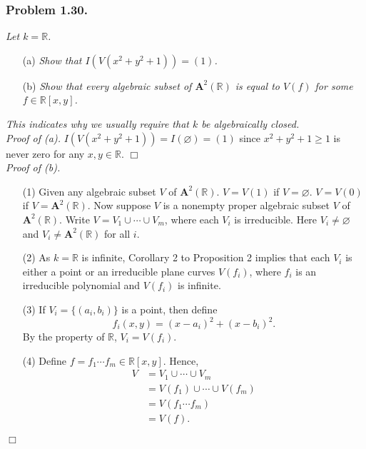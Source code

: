 \documentclass{article}
\begin{document}
\subsubsection*{Problem 1.30.}
\emph{Let $k = \mathbb{R}$.}
\begin{enumerate}
\item[(a)]
  \emph{Show that $I(V(x^2+y^2+1))=(1)$.}

\item[(b)]
  \emph{Show that every algebraic subset of $\mathbf{A}^2(\mathbb{R})$ is equal to $V(f)$
  for some $f \in \mathbb{R}[x,y]$.}
\end{enumerate}
\emph{This indicates why we usually require that $k$ be algebraically closed.} \\



\emph{Proof of (a).}
$I(V(x^2+y^2+1)) = I(\varnothing) = (1)$
since $x^2+y^2+1 \geq 1$ is never zero for any $x, y \in \mathbb{R}$.
$\Box$ \\



\emph{Proof of (b).}
\begin{enumerate}
\item[(1)]
  Given any algebraic subset $V$ of $\mathbf{A}^2(\mathbb{R})$.
  $V = V(1)$ if $V = \varnothing$.
  $V = V(0)$ if $V = \mathbf{A}^2(\mathbb{R})$.
  Now suppose $V$ is a nonempty proper algebraic subset $V$ of $\mathbf{A}^2(\mathbb{R})$.
  Write $V = V_1 \cup \cdots \cup V_m$,
  where each $V_i$ is irreducible.
  Here $V_i \neq \varnothing$ and $V_i \neq \mathbf{A}^2(\mathbb{R})$ for all $i$.

\item[(2)]
  As $k = \mathbb{R}$ is infinite,
  Corollary 2 to Proposition 2 implies that each $V_i$ is either a point
  or an irreducible plane curves $V(f_i)$,
  where $f_i$ is an irreducible polynomial and $V(f_i)$ is infinite.

\item[(3)]
  If $V_i = \{ (a_i,b_i) \}$ is a point, then define
  \[
    f_i(x,y) = (x-a_i)^2 + (x-b_i)^2.
  \]
  By the property of $\mathbb{R}$, $V_i = V(f_i)$.

\item[(4)]
  Define $f = f_1 \cdots f_m \in \mathbb{R}[x,y]$.
  Hence,
  \begin{align*}
    V
    &= V_1 \cup \cdots \cup V_m \\
    &= V(f_1) \cup \cdots \cup V(f_m) \\
    &= V(f_1 \cdots f_m) \\
    &= V(f).
  \end{align*}
\end{enumerate}
$\Box$ \\\\
\end{document}

